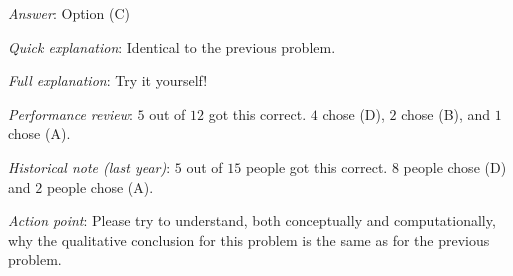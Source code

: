\documentclass[10pt]{amsart}
\begin{document}
\begin{enumerate}
  {\em Answer}: Option (C)

  {\em Quick explanation}: Identical to the previous problem.

  {\em Full explanation}: Try it yourself!

  {\em Performance review}: $5$ out of $12$ got this correct. $4$
  chose (D), $2$ chose (B), and $1$ chose (A).

  {\em Historical note (last year)}: $5$ out of $15$ people got this
  correct. $8$ people chose (D) and $2$ people chose (A).

  {\em Action point}: Please try to understand, both conceptually and
  computationally, why the qualitative conclusion for this problem is
  the same as for the previous problem.
\end{enumerate}
\end{document}

